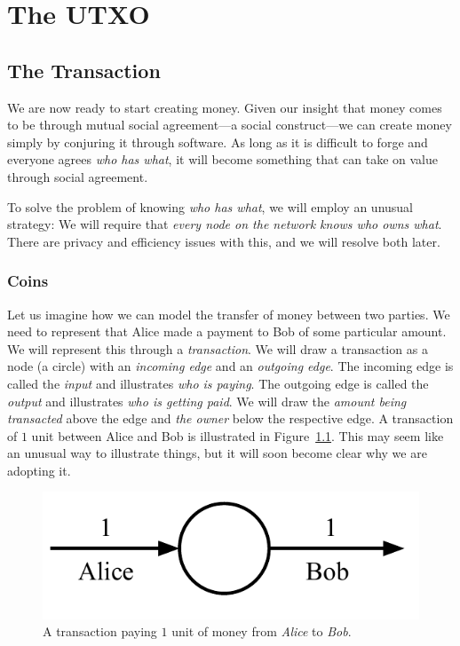 \chapter{The UTXO}


\section{The Transaction}
We are now ready to start creating money. Given our insight that money comes to be
through mutual social agreement---a social construct---we can create money simply by conjuring
it through software. As long as it is difficult to forge and everyone agrees
\emph{who has what}, it will become something that can take on value through social
agreement.

To solve the problem of knowing \emph{who has what}, we will employ an unusual strategy:
We will require that \emph{every node on the network knows who owns what}. There are privacy
and efficiency issues with this, and we will resolve both later.

\subsection*{Coins}

Let us imagine how we can model the transfer of money between two parties. We need to represent
that Alice made a payment to Bob of some particular amount. We will represent this through a
\emph{transaction}. We will draw a transaction as a node (a circle) with an \emph{incoming edge}
and an \emph{outgoing edge}. The incoming edge is called the \emph{input} and
illustrates \emph{who is paying}. The outgoing
edge is called the \emph{output} and illustrates
\emph{who is getting paid}. We will draw the \emph{amount being transacted}
above the edge and \emph{the owner} below the respective edge. A transaction of $1$ unit
between Alice and Bob is illustrated in Figure~\ref{fig.utxo-transaction}. This may seem like
an unusual way to illustrate things, but it will soon become clear why we are adopting it.

\begin{figure}[h]
    \centering
    \includegraphics[width=0.35 \columnwidth,keepaspectratio]{figures/utxo-transaction.pdf}
    \caption{A transaction paying $1$ unit of money from \emph{Alice} to \emph{Bob}.}
    \label{fig.utxo-transaction}
\end{figure}

